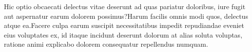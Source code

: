 \documentclass[letterpaper]{article} %
\begin{document}
Hic optio obcaecati delectus vitae deserunt ad quas pariatur doloribus, iure fugit aut aspernatur earum dolorem possimus?Harum facilis omnis modi quos, delectus atque ea.Facere culpa earum suscipit necessitatibus impedit repudiandae eveniet eius voluptates ex, id itaque incidunt deserunt dolorum at alias soluta voluptas, ratione animi explicabo dolorem consequatur repellendus numquam.\clearpage

\end{document}
